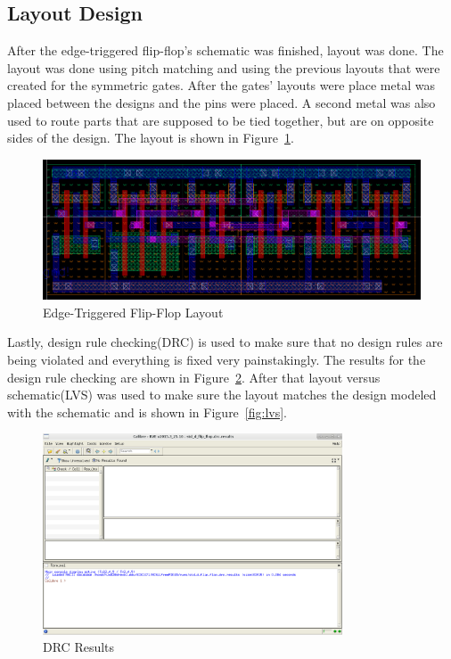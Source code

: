 \documentclass[12pt]{article}
\begin{document}
\subsection{Layout Design}
After the edge-triggered flip-flop's schematic was finished, layout was done. The layout was done using
pitch matching and using the previous layouts that were created for the symmetric gates.
After the gates' layouts were place metal was placed between the designs and the pins were
placed. A second metal was also used to route parts that are supposed to be tied together, but are
on opposite sides of the design. The layout is shown in Figure~\ref{fig:layout}.
\begin{figure}[!htb]
  \centering
  \includegraphics[width=5in]{figures/layout.png}
  \caption{Edge-Triggered Flip-Flop Layout}\label{fig:layout}
\end{figure}
Lastly, design rule checking(DRC) is used to make sure that no design rules are being violated and
everything is fixed very painstakingly. The results for the design rule checking are shown in
Figure~\ref{fig:drc}. After that layout versus schematic(LVS) was used to make sure the layout matches
the design modeled with the schematic and is shown in Figure~\ref{fig:lvs}.
\begin{figure}[!htb]
  \centering
  \includegraphics[width=3.5in]{figures/drc.png}
  \caption{DRC Results}\label{fig:drc}
\end{figure}
\end{document}
